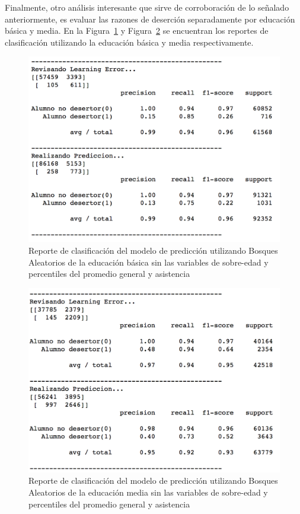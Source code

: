 Finalmente, otro análisis interesante que sirve de corroboración de lo señalado anteriormente, es evaluar las razones de deserción separadamente por educación básica y media. En la Figura~\ref{fig:clas-basica} y Figura~\ref{fig:clas-media} se encuentran los reportes de clasificación utilizando la educación básica y media respectivamente.

\begin{figure}[H]
  \centering
    \includegraphics[trim=0cm 0cm 0cm 0cm,scale=0.65]{Figuras/7AnalisisResultado/clas-basica.png}
      \caption{Reporte de clasificación del modelo de predicción utilizando Bosques Aleatorios de la educación básica sin las variables de sobre-edad y percentiles del promedio general y asistencia}
    \label{fig:clas-basica}
\end{figure}
\begin{figure}[H]
  \centering
    \includegraphics[trim=0cm 0cm 0cm 0cm,scale=0.65]{Figuras/7AnalisisResultado/clas-media.png}
      \caption{Reporte de clasificación del modelo de predicción utilizando Bosques Aleatorios de la educación media sin las variables de sobre-edad y percentiles del promedio general y asistencia}
    \label{fig:clas-media}
\end{figure}

